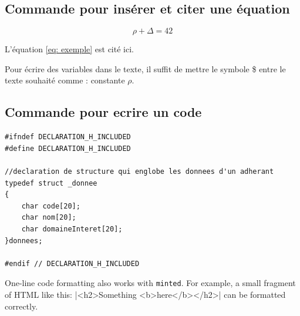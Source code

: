 \documentclass{rapportENSIAS}
\begin{document}
\subsection{Commande pour insérer et citer une équation}

\begin{equation} \label{eq: exemple}
\rho + \Delta = 42
\end{equation}

L'équation \ref{eq: exemple} est cité ici. 


Pour écrire des variables dans le texte, il suffit de mettre le symbole \$ entre le texte souhaité comme : constante $\rho$. 

\subsection{Commande pour ecrire un code}


\begin{listing}[!ht]
\begin{verbatim}
#ifndef DECLARATION_H_INCLUDED
#define DECLARATION_H_INCLUDED

//declaration de structure qui englobe les donnees d'un adherant
typedef struct _donnee
{
    char code[20];
    char nom[20];
    char domaineInteret[20];
}donnees;

#endif // DECLARATION_H_INCLUDED
\end{verbatim}
\caption{exemple de caption de code C}
\label{listing 1}
\end{listing}

One-line code formatting also works with \texttt{minted}. For example, a small fragment of HTML like this:
|<h2>Something <b>here</b></h2>|
\noindent can be formatted correctly.


\end{document}

